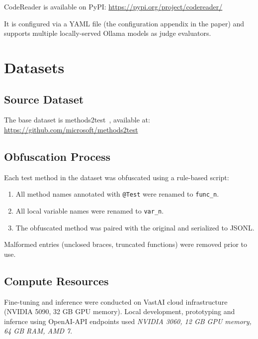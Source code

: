 CodeReader is available on PyPI:
\url{https://pypi.org/project/codereader/}

It is configured via a YAML file (the configuration appendix in the paper) and supports
multiple locally-served Ollama models as judge evaluators.


\chapter{Datasets}
\label{ch:data-sets}

\section*{Source Dataset}

The base dataset is methods2test~\cite{tufano2022methods2test}, available at:
\url{https://github.com/microsoft/methods2test}

\section*{Obfuscation Process}

Each test method in the dataset was obfuscated using a rule-based script:
\begin{enumerate}
  \item All method names annotated with \texttt{@Test} were renamed to \texttt{func\_n}.
  \item All local variable names were renamed to \texttt{var\_n}.
  \item The obfuscated method was paired with the original and serialized to JSONL.
\end{enumerate}
Malformed entries (unclosed braces, truncated functions) were removed prior to use.

\section*{Compute Resources}

Fine-tuning and inference were conducted on VastAI cloud infrastructure (NVIDIA 5090, 32 GB GPU memory).
Local development, prototyping and infernce using OpenAI-API endpoints used \emph{NVIDIA 3060, 12 GB GPU memory, 64 GB RAM, AMD 7}.

%

